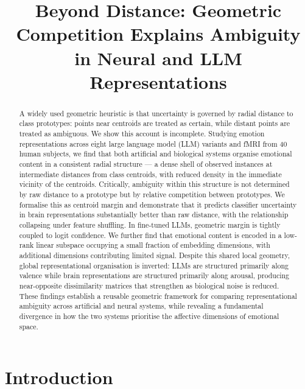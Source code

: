 \documentclass{article}
\title{Beyond Distance: Geometric Competition Explains Ambiguity in Neural and LLM Representations}
\author{}
\begin{document}
\maketitle

\begin{abstract}
A widely used geometric heuristic is that uncertainty is governed by radial distance to
class prototypes: points near centroids are treated as certain, while distant points are
treated as ambiguous.
We show this account is incomplete.
Studying emotion representations across eight large language model (LLM) variants and
fMRI from 40 human subjects, we find that both artificial and biological systems organise
emotional content in a consistent radial structure --- a dense shell of observed instances
at intermediate distances from class centroids, with reduced density in the immediate
vicinity of the centroids.
Critically, ambiguity within this structure is not determined by raw distance to a prototype
but by relative competition between prototypes.
We formalise this as centroid margin and demonstrate that it predicts classifier uncertainty
in brain representations substantially better than raw distance, with the relationship
collapsing under feature shuffling.
In fine-tuned LLMs, geometric margin is tightly coupled to logit confidence.
We further find that emotional content is encoded in a low-rank linear subspace occupying
a small fraction of embedding dimensions, with additional dimensions contributing limited
signal.
Despite this shared local geometry, global representational organisation is inverted:
LLMs are structured primarily along valence while brain representations are structured
primarily along arousal, producing near-opposite dissimilarity matrices that strengthen
as biological noise is reduced.
These findings establish a reusable geometric framework for comparing representational
ambiguity across artificial and neural systems, while revealing a fundamental divergence
in how the two systems prioritise the affective dimensions of emotional space.
\end{abstract}

\section{Introduction}
\end{document}
